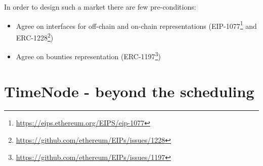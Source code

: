 \documentclass{report}
\begin{document}
  In order to design such a market there are few pre-conditions:
  
  \begin{itemize}
    \item Agree on interfaces for off-chain and on-chain representations (EIP-1077\footnote{\url{https://eips.ethereum.org/EIPS/eip-1077}} and ERC-1228\footnote{\url{https://github.com/ethereum/EIPs/issues/1228}})
    \item Agree on bounties representation (ERC-1197\footnote{\url{https://github.com/ethereum/EIPs/issues/1197}})
  \end{itemize}

  \section{TimeNode - beyond the scheduling}
\end{document}
